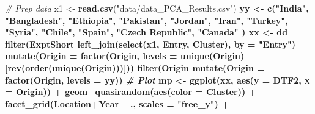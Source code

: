 \documentclass[
]{article}
\newenvironment{Shaded}{\begin{snugshade}}{\end{snugshade}}
\newcommand{\CommentTok}[1]{\textcolor[rgb]{0.56,0.35,0.01}{\textit{#1}}}
\newcommand{\DataTypeTok}[1]{\textcolor[rgb]{0.13,0.29,0.53}{#1}}
\newcommand{\KeywordTok}[1]{\textcolor[rgb]{0.13,0.29,0.53}{\textbf{#1}}}
\newcommand{\NormalTok}[1]{#1}
\newcommand{\OperatorTok}[1]{\textcolor[rgb]{0.81,0.36,0.00}{\textbf{#1}}}
\newcommand{\StringTok}[1]{\textcolor[rgb]{0.31,0.60,0.02}{#1}}
\begin{document}
\begin{Shaded}
\begin{Highlighting}[]
\CommentTok{# Prep data}
\NormalTok{x1 <-}\StringTok{ }\KeywordTok{read.csv}\NormalTok{(}\StringTok{"data/data_PCA_Results.csv"}\NormalTok{) }\OperatorTok{%
\NormalTok{yy <-}\StringTok{ }\KeywordTok{c}\NormalTok{(}\StringTok{"India"}\NormalTok{, }\StringTok{"Bangladesh"}\NormalTok{, }\StringTok{"Ethiopia"}\NormalTok{, }\StringTok{"Pakistan"}\NormalTok{, }\StringTok{"Jordan"}\NormalTok{,}
        \StringTok{"Iran"}\NormalTok{, }\StringTok{"Turkey"}\NormalTok{, }\StringTok{"Syria"}\NormalTok{, }\StringTok{"Chile"}\NormalTok{, }\StringTok{"Spain"}\NormalTok{, }\StringTok{"Czech Republic"}\NormalTok{, }\StringTok{"Canada"}\NormalTok{ )}
\NormalTok{xx <-}\StringTok{ }\NormalTok{dd }\OperatorTok{%
\StringTok{  }\KeywordTok{filter}\NormalTok{(ExptShort }\OperatorTok{%
\StringTok{  }\KeywordTok{left_join}\NormalTok{(}\KeywordTok{select}\NormalTok{(x1, Entry, Cluster), }\DataTypeTok{by =} \StringTok{"Entry"}\NormalTok{) }\OperatorTok{%
\StringTok{  }\KeywordTok{mutate}\NormalTok{(}\DataTypeTok{Origin =} \KeywordTok{factor}\NormalTok{(Origin, }\DataTypeTok{levels =} \KeywordTok{unique}\NormalTok{(Origin)[}\KeywordTok{rev}\NormalTok{(}\KeywordTok{order}\NormalTok{(}\KeywordTok{unique}\NormalTok{(Origin)))])) }\OperatorTok{%
\StringTok{  }\KeywordTok{filter}\NormalTok{(Origin }\OperatorTok{%
\StringTok{  }\KeywordTok{mutate}\NormalTok{(}\DataTypeTok{Origin =} \KeywordTok{factor}\NormalTok{(Origin, }\DataTypeTok{levels =}\NormalTok{ yy))}
\CommentTok{# Plot}
\NormalTok{mp <-}\StringTok{ }\KeywordTok{ggplot}\NormalTok{(xx, }\KeywordTok{aes}\NormalTok{(}\DataTypeTok{y =}\NormalTok{ DTF2, }\DataTypeTok{x =}\NormalTok{ Origin)) }\OperatorTok{+}\StringTok{ }
\StringTok{  }\KeywordTok{geom_quasirandom}\NormalTok{(}\KeywordTok{aes}\NormalTok{(}\DataTypeTok{color =}\NormalTok{ Cluster)) }\OperatorTok{+}\StringTok{ }
\StringTok{  }\KeywordTok{facet_grid}\NormalTok{(Location}\OperatorTok{+}\NormalTok{Year }\OperatorTok{~}\StringTok{ }\NormalTok{., }\DataTypeTok{scales =} \StringTok{"free_y"}\NormalTok{) }\OperatorTok{+}
}}}}}}
\end{Highlighting}
\end{Shaded}
\end{document}
